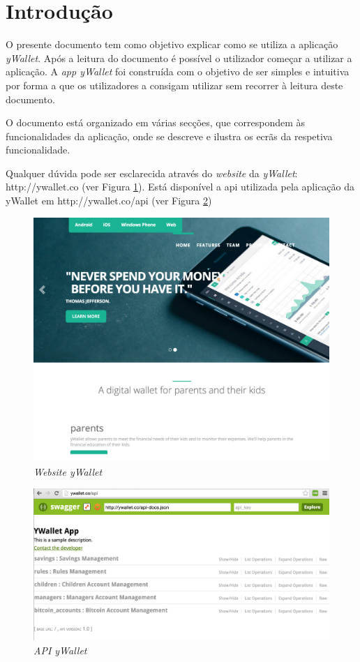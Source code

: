 \documentclass{article}
\begin{document}


\tableofcontents

\pagebreak

  \section{Introdução}
  O presente documento tem como objetivo explicar como se utiliza a aplicação \textit{yWallet}. Após a leitura do documento é possível o utilizador começar a utilizar a aplicação. A \textit{app yWallet} foi construída com o objetivo de ser simples e intuitiva por forma a que os utilizadores a consigam utilizar sem recorrer à leitura deste documento. 

  O documento está organizado em várias secções, que correspondem às funcionalidades da aplicação, onde se descreve e ilustra os ecrãs da respetiva funcionalidade.

  Qualquer dúvida pode ser esclarecida através do \textit{website} da \textit{yWallet}: http://ywallet.co (ver Figura \ref{website}). Está disponível a api utilizada pela aplicação da yWallet em http://ywallet.co/api (ver Figura \ref{api})

  \begin{figure}[H]
    \begin{center}
      \includegraphics[width=0.5
      \textwidth]{website.png}
    \end{center}
    \caption{\textit{Website yWallet}}
    \label{website}
  \end{figure}

  \begin{figure}[H]
    \begin{center}
      \includegraphics[width=0.5
      \textwidth]{api.png}
    \end{center}
    \caption{\textit{API yWallet}}
    \label{api}
  \end{figure}
\end{document}
